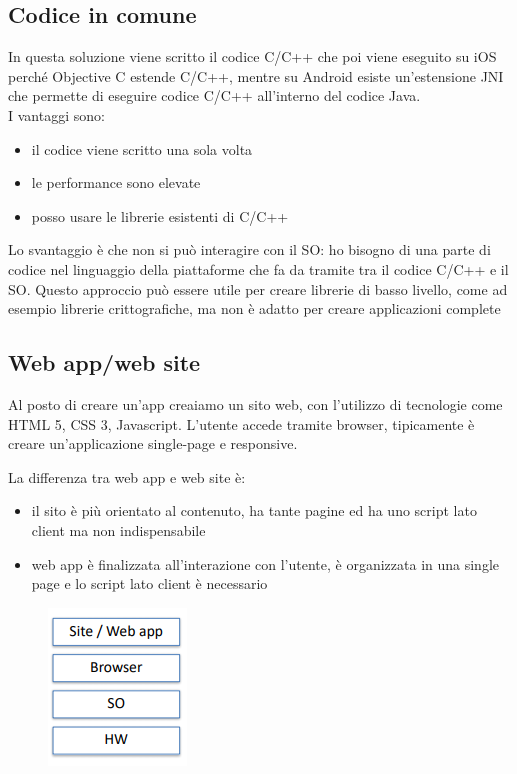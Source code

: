\subsection{Codice in comune}
In questa soluzione viene scritto il codice C/C++ che poi viene eseguito su iOS perché Objective C estende C/C++, mentre su Android esiste un'estensione JNI che permette di eseguire codice C/C++ all'interno del codice Java. 
\\ I vantaggi sono:
\begin{itemize}
    \item il codice viene scritto una sola volta
    \item le performance sono elevate
    \item posso usare le librerie esistenti di C/C++
\end{itemize}
Lo svantaggio è che non si può interagire con il SO: ho bisogno di una parte di codice nel linguaggio della piattaforme che fa da tramite tra il codice C/C++ e il SO. 
Questo approccio può essere utile per creare librerie di basso livello, come ad esempio librerie crittografiche, ma non è adatto per creare applicazioni complete 

\subsection{Web app/web site}
Al posto di creare un'app creaiamo un sito web, con l'utilizzo di tecnologie come HTML 5, CSS 3, Javascript. L'utente accede tramite browser, tipicamente è creare un'applicazione single-page e responsive. 

La differenza tra web app e web site è:
\begin{itemize}
    \item il sito è più orientato al contenuto, ha tante pagine ed ha uno script lato client ma non indispensabile
    \item web app è finalizzata all'interazione con l'utente, è organizzata in una single page e lo script lato client è necessario
\end{itemize}

\begin{figure}[!ht]
    \centering
    \includegraphics[width=.20\textwidth]{images/Mobile computing/7. Sviluppo/web app.PNG}
    \label{fig:sito web}
\end{figure}

